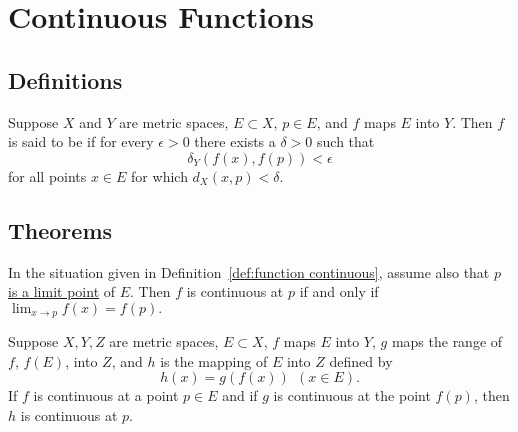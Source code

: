 \section{Continuous Functions}
\subsection{Definitions}
\begin{definition}\label{def:function continuous}
	Suppose $X$ and $Y$ are metric spaces, $E \subset X$, $p \in E$, and $f$ maps $E$ into $Y$. Then $f$ is said to be {}  if for every $\epsilon > 0$ there exists a $\delta >0 $ such that $$\delta_Y(f(x),f(p)) < \epsilon$$ for all points $x \in E$ for which $d_X(x,p) < \delta.$
\end{definition}

\subsection{Theorems}
\begin{theorem}
	In the situation given in Definition~\ref{def:function continuous}, assume also that {\underline{$p$ is a limit point}}  of $E$. Then $f$ is continuous at $p$ if and only if $\lim_{x \to p} f(x) = f(p).$
\end{theorem}

\begin{theorem}
	Suppose $X, Y, Z$ are metric spaces, $E \subset X$, $f$ maps $E$ into $Y$, $g$ maps the range of $f$, $f(E)$, into $Z$, and $h$ is the mapping of $E$ into $Z$ defined by $$h(x) = g(f(x)) ~ ~ (x \in E).$$ If $f$ is continuous at a point $p \in E$ and if $g$ is continuous at the point $f(p)$, then $h$ is continuous at $p$.
\end{theorem}




